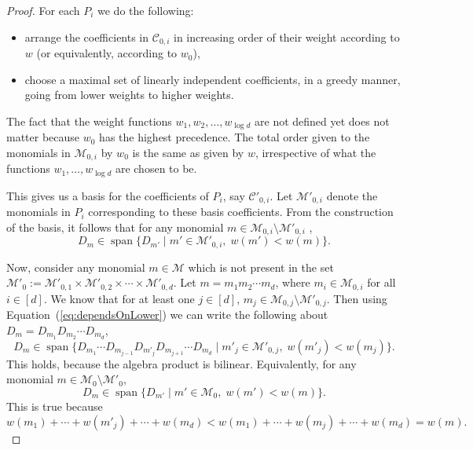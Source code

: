 \documentclass[final,oneeqnum, onethmnum, onefignum]{siamltex1213}
\newcommand{\C}{\mathcal C}
\newcommand{\M}{\mathcal M}
\DeclareMathOperator{\Span}{span}
\begin{document}
\begin{proof}
For each $P_i$ we do the following: 
\begin{itemize}
\item arrange the coefficients in $\C_{0,i}$ 
in increasing order of their weight according to $w$ 
(or equivalently, according to $w_0$),
\item choose a maximal set of linearly independent coefficients, in a greedy manner, 
going from lower weights to higher weights. 
\end{itemize}
The fact that the weight functions $w_1, w_2, \dots, w_{\log d}$
are not defined yet does not matter because
$w_0$ has the highest precedence. 
The total order given to the monomials in $\M_{0,i}$ by $w_0$
is the same as given by $w$, irrespective of what the functions 
$w_1, \dots, w_{\log d}$ are chosen to be.

This gives us a basis for the
coefficients of $P_i$, say $\C'_{0,i}$. 
Let $\M'_{0,i}$ denote the monomials in $P_i$ corresponding to these
basis coefficients. 
From the construction of the basis, it follows that
for any monomial $m \in \M_{0,i} \setminus \M'_{0,i}$ ,
\begin{equation}
\label{eq:dependsOnLower}
D_m \in \Span \{ D_{m'} \mid m' \in \M'_{0,i}, \; w(m') < w(m) \} .
\end{equation}

Now, consider any monomial $m \in \M$ which is not present in   
the set $\M'_0 := \M'_{0,1} \times \M'_{0,2} \times \dotsm \times \M'_{0,d}$. 
Let $m = m_1 m_2 \dotsm m_d$, where $m_i \in \M_{0,i}$ for all $i \in [d]$.
We know that for at least one $j \in [d]$, $m_j \in \M_{0,j} \setminus \M'_{0,j}$.
Then using Equation~(\ref{eq:dependsOnLower}) we can write the following about
$D_m = D_{m_1} D_{m_2} \dotsm D_{m_d}$,
$$ D_m\in \Span
\{ D_{m_1} \dotsm D_{m_{j-1}} D_{m'_j} D_{m_{j+1}} \dotsm D_{m_d}
\mid m'_j \in \M'_{0,j}, \; w({m'_j}) < w({m_j})
 \}.
 $$
This holds, because the algebra product is bilinear. 
Equivalently, for any monomial $m \in \M_0 \setminus \M'_0$,
$$ D_m \in \Span \{ D_{m'} \mid m' \in \M_0, \; w(m') < w({m}) \} . $$
This is true because 
$$w({m_1}) + \dotsm + w({m'_j}) + \dotsm + w({m_d}) 
< w({m_1}) + \dotsm + w({m_j}) + \dotsm + w({m_d}) =
w({m})
.$$


\end{proof}
\end{document}
